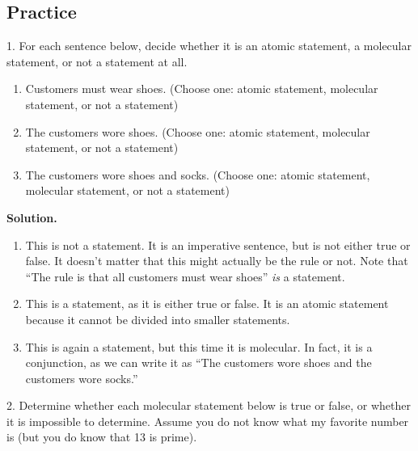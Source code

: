 \documentclass[10pt,]{book}
\theoremstyle{plain}
\theoremstyle{definition}
\theoremstyle{definition}
\numberwithin{equation}{chapter}
\begin{document}
\subsection[{Practice}]{Practice}\label{practice_intro-statements}
\begin{exerciselist}
\item[1.]\hypertarget{exercise-1}{}\noindent%
\hypertarget{p-160}{}%
For each sentence below, decide whether it is an atomic statement, a molecular statement, or not a statement at all.%
\par
\hypertarget{p-161}{}%
\leavevmode%
\begin{enumerate}[label=(\alph*)]
\item\hypertarget{li-67}{}\hypertarget{p-162}{}%
Customers must wear shoes. (Choose one: atomic statement, molecular statement, or not a statement)%
\item\hypertarget{li-68}{}\hypertarget{p-163}{}%
The customers wore shoes. (Choose one: atomic statement, molecular statement, or not a statement)%
\item\hypertarget{li-69}{}\hypertarget{p-164}{}%
The customers wore shoes and socks. (Choose one: atomic statement, molecular statement, or not a statement)%
\end{enumerate}
%
\par
\medskip\noindent%
\textbf{Solution.}\quad \hypertarget{p-165}{}%
\leavevmode%
\begin{enumerate}[label=(\alph*)]
\item\hypertarget{li-70}{}\hypertarget{p-166}{}%
This is not a statement.  It is an imperative sentence, but is not either true or false.  It doesn't matter that this might actually be the rule or not.  Note that ``The rule is that all customers must wear shoes'' \emph{is} a statement.%
\item\hypertarget{li-71}{}\hypertarget{p-167}{}%
This is a statement, as it is either true or false.  It is an atomic statement because it cannot be divided into smaller statements.%
\item\hypertarget{li-72}{}\hypertarget{p-168}{}%
This is again a statement, but this time it is molecular.  In fact, it is a conjunction, as we can write it as ``The customers wore shoes and the customers wore socks.''%
\end{enumerate}
%
\par
\item[2.]\hypertarget{exercise-2}{}\noindent%
\hypertarget{p-169}{}%
Determine whether each molecular statement below is true or false, or whether it is impossible to determine.  Assume you do not know what my favorite number is (but you do know that 13 is prime).%

\end{exerciselist}
\end{document}
